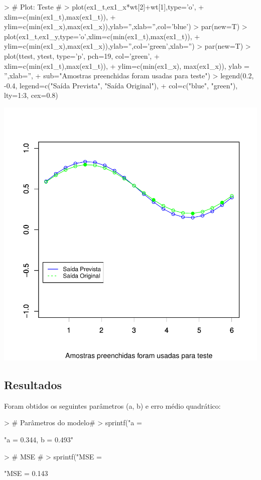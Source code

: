 \documentclass{article}
\begin{document}
\begin{Schunk}
\begin{Sinput}
> # Plot: Teste #
> plot(ex1_t,ex1_x*wt[2]+wt[1],type='o',
+      xlim=c(min(ex1_t),max(ex1_t)),
+      ylim=c(min(ex1_x),max(ex1_x)),ylab='',xlab='',col='blue')
> par(new=T)
> plot(ex1_t,ex1_y,type='o',xlim=c(min(ex1_t),max(ex1_t)),
+      ylim=c(min(ex1_x),max(ex1_x)),ylab='',col='green',xlab='')
> par(new=T)
> plot(ttest, ytest, type='p', pch=19, col='green',
+      xlim=c(min(ex1_t),max(ex1_t)), 
+      ylim=c(min(ex1_x), max(ex1_x)), ylab = '',xlab='',
+      sub="Amostras preenchidas foram usadas para teste")
> legend(0.2, -0.4, legend=c("Saída Prevista", "Saída Original"),
+        col=c("blue", "green"), lty=1:3, cex=0.8)
\end{Sinput}
\end{Schunk}
\includegraphics{adaline-004}

\subsection{Resultados}
Foram obtidos os seguintes parâmetros (a, b) e erro médio quadrático:
\begin{Schunk}
\begin{Sinput}
> # Parâmetros do modelo#
> sprintf("a = %
\end{Sinput}
\begin{Soutput}
[1] "a = 0.344, b = 0.493"
\end{Soutput}
\begin{Sinput}
> # MSE #
> sprintf("MSE = %
\end{Sinput}
\begin{Soutput}
[1] "MSE = 0.143%
\end{Soutput}
\end{Schunk}
\end{document}
